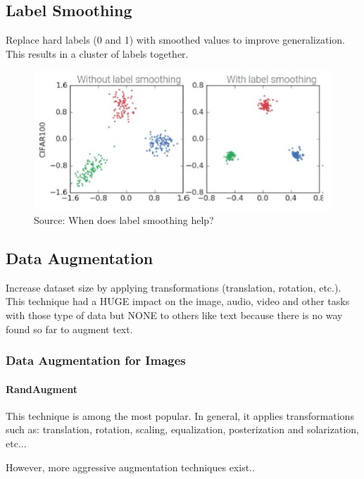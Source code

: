 \documentclass{article}
\begin{document}
\subsection{Label Smoothing}
Replace hard labels (0 and 1) with smoothed values to improve generalization. This results in a cluster of labels together.

\begin{figure}
    \centering
    \includegraphics[width=1\linewidth]{graphics/S4Regularisation/label-smoothing.jpg}
    \caption{Source: When does label smoothing help?}
    \label{fig:enter-label}
\end{figure}

\subsection{Data Augmentation}
Increase dataset size by applying transformations (translation, rotation, etc.). This technique had a HUGE impact on the image, audio, video and other tasks with those type of data but NONE to others like text because there is no way found so far to augment text.

\subsubsection{Data Augmentation for Images}

\paragraph{RandAugment} This technique is among the most popular. In general, it applies transformations such as: translation, rotation, scaling, equalization, posterization and solarization, etc...

However, more aggressive augmentation techniques exist..
\end{document}
